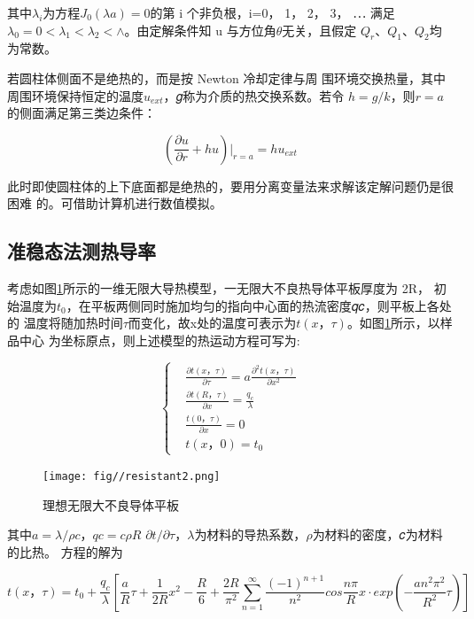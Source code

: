 \documentclass[10pt,a4paper,twoside,UTF8]{ctexart}
\begin{document}
其中$\lambda_i$为方程$J_0(\lambda a)=0$的第 i 个非负根，i=0， 1， 2， 3， ⋯ 满足
$\lambda_0=0 < \lambda_1<\lambda_2<\wedge $。由定解条件知 u 与方位角$\theta$无关，且假定
$Q_r$、$Q_1$、$Q_2$均为常数。

若圆柱体侧面不是绝热的，而是按 Newton 冷却定律与周
围环境交换热量，其中周围环境保持恒定的温度$u_{ext}$，𝑔称为介质的热交换系数。若令
$h = g/k$，则$r = a$的侧面满足第三类边条件：

\begin{equation*}
	\left(\frac{\partial u}{\partial r}+hu\right)|_{r=a}=hu_{ext}
\end{equation*}

此时即使圆柱体的上下底面都是绝热的，要用分离变量法来求解该定解问题仍是很困难
的。可借助计算机进行数值模拟。

\subsection{准稳态法测热导率}
考虑如图\ref{fig: model2}所示的一维无限大导热模型，一无限大不良热导体平板厚度为 2R，
初始温度为$t_0$，在平板两侧同时施加均匀的指向中心面的热流密度𝑞𝑐，则平板上各处的
温度将随加热时间$\tau$而变化，故x处的温度可表示为$t(x， \tau)$。如图\ref{fig: model2}所示，以样品中心
为坐标原点，则上述模型的热运动方程可写为:

\[\left\{
\begin{aligned}
&\frac{\partial t(x，\tau)}{\partial \tau}=a\frac{\partial^2t(x，\tau)}{\partial x^2}\\
&\frac{\partial t(R，\tau)}{\partial x}=\frac{q_c}{\lambda}\\
&\frac{t(0，\tau)}{\partial x}=0\\
&t(x，0)=t_0
\end{aligned}
\right.
\]

\begin{figure}[H]
	\centering
	\texttt{[image: fig//resistant2.png]}
	\caption{理想无限大不良导体平板}
	\label{fig: model2}
\end{figure}

其中$a = \lambda /\rho c$，$qc = c\rho R$ $\partial t/\partial \tau$，$\lambda$为材料的导热系数，$\rho$为材料的密度，𝑐为材料的比热。
方程的解为

\begin{equation*}
	t(x，\tau)=t_0+\frac{q_c}{\lambda}\left[\frac{a}{R}\tau +\frac{1}{2R}x^2-\frac{R}{6}+\frac{2R}{\pi^2}\sum_{n = 1}^{\infty} \frac{(-1)^{n+1}}{n^2} cos \frac{n\pi}{R}x \cdot exp \left(-\frac{an^2 \pi^2}{R^2}\tau\right)\right]
\end{equation*}
\end{document}

